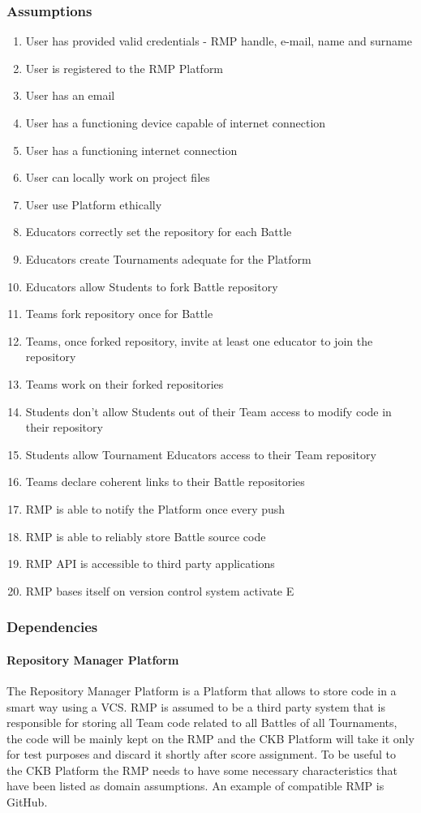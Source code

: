 \subsubsection{Assumptions}
\begin{enumerate}[label=$\bullet$ \textbf{D\arabic*:}]
    \item User has provided valid credentials - RMP handle, e-mail, name and surname
    \item User is registered to the RMP Platform
    \item User has an email
    \item User has a functioning device capable of internet connection
    \item User has a functioning internet connection
    \item User can locally work on project files
    \item User use Platform ethically
    \item Educators correctly set the repository for each Battle
    \item Educators create Tournaments adequate for the Platform
    \item Educators allow Students to fork Battle repository
    \item Teams fork repository once for Battle
    \item Teams, once forked repository, invite at least one educator to join the repository
    \item Teams work on their forked repositories
    \item Students don't allow Students out of their Team access to modify code in their repository
    \item Students allow Tournament Educators access to their Team repository
    \item Teams declare coherent links to their Battle repositories
    \item RMP is able to notify the Platform once every push
    \item RMP is able to reliably store Battle source code
    \item RMP API is accessible to third party applications
    \item RMP bases itself on version control system
    activate E\end{enumerate}
\subsubsection{Dependencies}
\paragraph{Repository Manager Platform}
The Repository Manager Platform is a Platform that allows to store code in a smart way using a VCS.
RMP is assumed to be a third party system that is responsible for storing all Team code related to all Battles of all Tournaments, the code will be mainly kept on the RMP and the CKB Platform will take it only for test purposes and discard it shortly after score assignment. 
To be useful to the CKB Platform the RMP needs to have some necessary characteristics that have been listed as domain assumptions.
An example of compatible RMP is GitHub.

